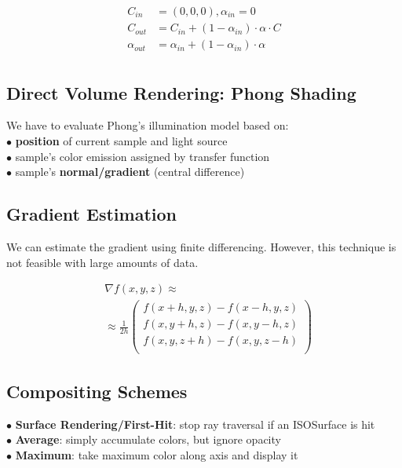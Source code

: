 \begin{align*}
    C_{in} &= (0,0,0), \alpha_{in} = 0                         \\
    C_{out} &= C_{in} + (1 - \alpha_{in}) \cdot \alpha \cdot C \\
    \alpha_{out} &= \alpha_{in} + (1 - \alpha_{in}) \cdot \alpha    \\
\end{align*}



\begin{center}
\end{center}

\subsection{Direct Volume Rendering: Phong Shading}
We have to evaluate Phong's illumination model based on: \\
$\bullet$ \textbf{position} of current sample and light source \\
$\bullet$ sample's \textnormal{color} emission assigned by transfer function \\
$\bullet$ sample's \textbf{normal/gradient} (central difference)

\subsection{Gradient Estimation}
We can estimate the gradient using finite differencing. However, this technique is not feasible with large amounts of data.

\begin{align*}
    & \nabla f(x, y, z) \approx \\
    & \approx \frac{1}{2h} \begin{pmatrix}
        f(x + h, y, z) - f(x - h, y, z) \\
        f(x, y + h, z) - f(x, y - h, z) \\
        f(x, y, z + h) - f(x, y, z - h) \\
    \end{pmatrix}
\end{align*}

\subsection{Compositing Schemes}
$\bullet$ \textbf{Surface Rendering/First-Hit}: stop ray traversal if an ISOSurface is hit \\
$\bullet$ \textbf{Average}: simply accumulate colors, but ignore opacity \\
$\bullet$ \textbf{Maximum}: take maximum color along axis and display it